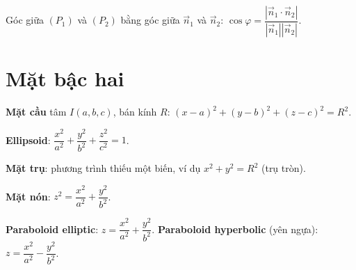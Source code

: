 \documentclass[12pt,a4paper]{article}
\begin{document}
\begin{phuongphap}[title={Góc giữa hai mặt phẳng}]
  Góc giữa $(P_1)$ và $(P_2)$ bằng góc giữa $\vec{n}_1$ và $\vec{n}_2$: $\cos\varphi = \dfrac{|\vec{n}_1 \cdot \vec{n}_2|}{|\vec{n}_1||\vec{n}_2|}$.
\end{phuongphap}

\section{Mặt bậc hai}

\begin{dinhnghia}
  \textbf{Mặt cầu} tâm $I(a, b, c)$, bán kính $R$: $(x-a)^2 + (y-b)^2 + (z-c)^2 = R^2$.
\end{dinhnghia}

\begin{dinhnghia}
  \textbf{Ellipsoid}: $\dfrac{x^2}{a^2} + \dfrac{y^2}{b^2} + \dfrac{z^2}{c^2} = 1$.
\end{dinhnghia}

\begin{dinhnghia}
  \textbf{Mặt trụ}: phương trình thiếu một biến, ví dụ $x^2 + y^2 = R^2$ (trụ tròn).
\end{dinhnghia}

\begin{dinhnghia}
  \textbf{Mặt nón}: $z^2 = \dfrac{x^2}{a^2} + \dfrac{y^2}{b^2}$.
\end{dinhnghia}

\begin{dinhnghia}
  \textbf{Paraboloid elliptic}: $z = \dfrac{x^2}{a^2} + \dfrac{y^2}{b^2}$. \textbf{Paraboloid hyperbolic} (yên ngựa): $z = \dfrac{x^2}{a^2} - \dfrac{y^2}{b^2}$.
\end{dinhnghia}
\end{document}
